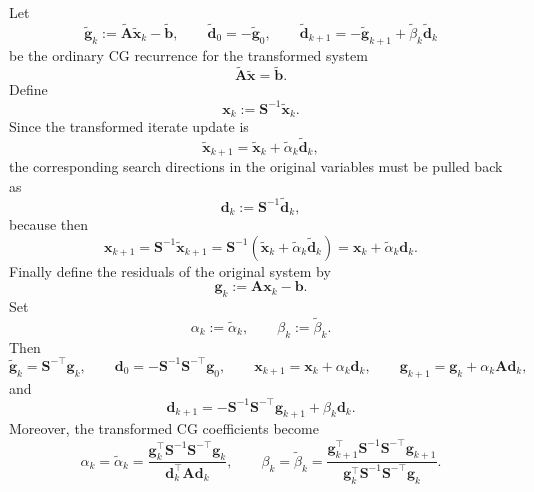 \begin{claim}
\label{clm:ch5-pcg-derivation}
Let
\[
  \tilde{\mathbf{g}}_k:=\tilde{\mathbf{A}}\tilde{\mathbf{x}}_k-\tilde{\mathbf{b}},
  \qquad
  \tilde{\mathbf{d}}_0=-\tilde{\mathbf{g}}_0,
  \qquad
  \tilde{\mathbf{d}}_{k+1}
  =-\tilde{\mathbf{g}}_{k+1}+\tilde{\beta}_k \tilde{\mathbf{d}}_k
\]
be the ordinary CG recurrence for the transformed system
\[
  \tilde{\mathbf{A}}\tilde{\mathbf{x}}=\tilde{\mathbf{b}}.
\]
Define
\[
  \mathbf{x}_k:=\mathbf{S}^{-1}\tilde{\mathbf{x}}_k.
\]
Since the transformed iterate update is
\[
  \tilde{\mathbf{x}}_{k+1}
  =\tilde{\mathbf{x}}_k+\tilde{\alpha}_k \tilde{\mathbf{d}}_k,
\]
the corresponding search directions in the original variables must be pulled
back as
\[
  \mathbf{d}_k:=\mathbf{S}^{-1}\tilde{\mathbf{d}}_k,
\]
because then
\[
  \mathbf{x}_{k+1}
  =\mathbf{S}^{-1}\tilde{\mathbf{x}}_{k+1}
  =\mathbf{S}^{-1}(\tilde{\mathbf{x}}_k+\tilde{\alpha}_k \tilde{\mathbf{d}}_k)
  =\mathbf{x}_k+\tilde{\alpha}_k \mathbf{d}_k.
\]
Finally define the residuals of the original system by
\[
  \mathbf{g}_k:=\mathbf{A}\mathbf{x}_k-\mathbf{b}.
\]
Set
\[
  \alpha_k:=\tilde{\alpha}_k,
  \qquad
  \beta_k:=\tilde{\beta}_k.
\]
Then
\[
  \tilde{\mathbf{g}}_k=\mathbf{S}^{-\top}\mathbf{g}_k,
  \qquad
  \mathbf{d}_0=-\mathbf{S}^{-1}\mathbf{S}^{-\top}\mathbf{g}_0,
  \qquad
  \mathbf{x}_{k+1}=\mathbf{x}_k+\alpha_k \mathbf{d}_k,
  \qquad
  \mathbf{g}_{k+1}=\mathbf{g}_k+\alpha_k \mathbf{A}\mathbf{d}_k,
\]
and
\[
  \mathbf{d}_{k+1}
  =-\mathbf{S}^{-1}\mathbf{S}^{-\top}\mathbf{g}_{k+1}+\beta_k \mathbf{d}_k.
\]
Moreover, the transformed CG coefficients become
\[
  \alpha_k=\tilde{\alpha}_k
  =\frac{\mathbf{g}_k^{\top}\mathbf{S}^{-1}\mathbf{S}^{-\top}\mathbf{g}_k}
  {\mathbf{d}_k^{\top}\mathbf{A}\mathbf{d}_k},
  \qquad
  \beta_k=\tilde{\beta}_k
  =\frac{\mathbf{g}_{k+1}^{\top}\mathbf{S}^{-1}\mathbf{S}^{-\top}\mathbf{g}_{k+1}}
  {\mathbf{g}_k^{\top}\mathbf{S}^{-1}\mathbf{S}^{-\top}\mathbf{g}_k}.
\]
\end{claim}
